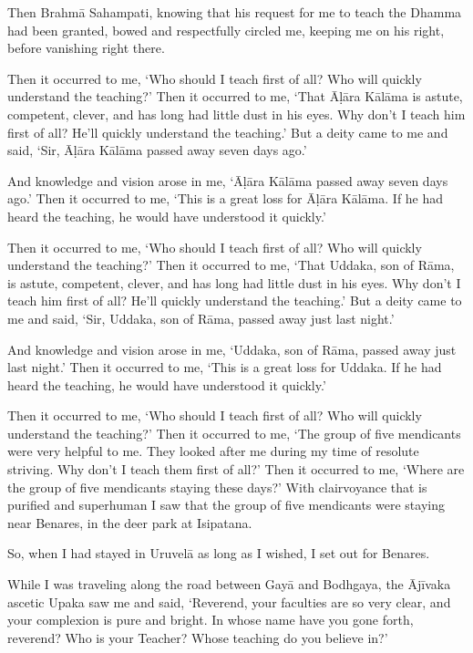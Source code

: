 \documentclass[12pt,openany]{book}%
\begin{document}
Then \textsanskrit{Brahmā} Sahampati, knowing that his request for me to teach the Dhamma had been granted, bowed and respectfully circled me, keeping me on his right, before vanishing right there. 

Then it occurred to me, ‘Who should I teach first of all? Who will quickly understand the teaching?’ Then it occurred to me, ‘That \textsanskrit{Āḷāra} \textsanskrit{Kālāma} is astute, competent, clever, and has long had little dust in his eyes. Why don’t I teach him first of all? He’ll quickly understand the teaching.’ But a deity came to me and said, ‘Sir, \textsanskrit{Āḷāra} \textsanskrit{Kālāma} passed away seven days ago.’ 

And knowledge and vision arose in me, ‘\textsanskrit{Āḷāra} \textsanskrit{Kālāma} passed away seven days ago.’ Then it occurred to me, ‘This is a great loss for \textsanskrit{Āḷāra} \textsanskrit{Kālāma}. If he had heard the teaching, he would have understood it quickly.’ 

Then it occurred to me, ‘Who should I teach first of all? Who will quickly understand the teaching?’ Then it occurred to me, ‘That Uddaka, son of \textsanskrit{Rāma}, is astute, competent, clever, and has long had little dust in his eyes. Why don’t I teach him first of all? He’ll quickly understand the teaching.’ But a deity came to me and said, ‘Sir, Uddaka, son of \textsanskrit{Rāma}, passed away just last night.’ 

And knowledge and vision arose in me, ‘Uddaka, son of \textsanskrit{Rāma}, passed away just last night.’ Then it occurred to me, ‘This is a great loss for Uddaka. If he had heard the teaching, he would have understood it quickly.’ 

Then it occurred to me, ‘Who should I teach first of all? Who will quickly understand the teaching?’ Then it occurred to me, ‘The group of five mendicants were very helpful to me. They looked after me during my time of resolute striving. Why don’t I teach them first of all?’ Then it occurred to me, ‘Where are the group of five mendicants staying these days?’ With clairvoyance that is purified and superhuman I saw that the group of five mendicants were staying near Benares, in the deer park at Isipatana. 

So, when I had stayed in \textsanskrit{Uruvelā} as long as I wished, I set out for Benares. 

While I was traveling along the road between \textsanskrit{Gayā} and Bodhgaya, the \textsanskrit{Ājīvaka} ascetic Upaka saw me and said, ‘Reverend, your faculties are so very clear, and your complexion is pure and bright. In whose name have you gone forth, reverend? Who is your Teacher? Whose teaching do you believe in?’ 
\end{document}
